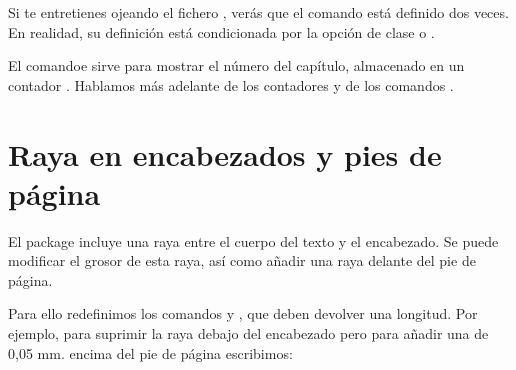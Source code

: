 \begin{plusloins}
Si te entretienes ojeando el fichero , verás que el comando  está definido dos veces. En realidad, su definición está condicionada por la opción de clase  o .
\end{plusloins}

\begin{plusloins}
El comandoe  sirve para mostrar el número del capítulo, almacenado en un contador . Hablamos más adelante de los contadores y de los comandos .
\end{plusloins}


\section{Raya en encabezados y pies de página}

El package  incluye una raya entre el cuerpo del texto y el encabezado. Se puede modificar el grosor de esta raya, así como añadir una raya delante del pie de página.

Para ello redefinimos los comandos  y , que deben devolver una longitud.
Por ejemplo, para suprimir la raya debajo del encabezado pero para añadir una de 0,05 mm. encima del pie de página escribimos:

\begin{latexcode}
\renewcommand{\headrulewidth}[0]{0pt}
\renewcommand{\footrulewidth}[0]{0.05mm}
\end{latexcode}
